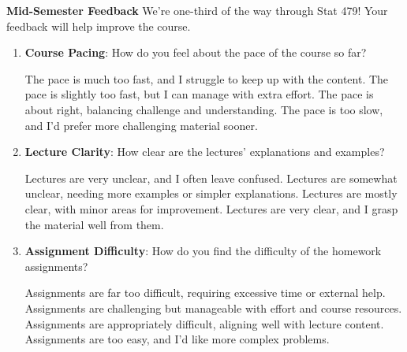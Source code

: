 \documentclass[12pt,letterpaper, onecolumn]{exam}
\begin{document}
\begin{questions}
\begin{solution}
    \begin{parts}
        \part 
        \part 
        \part 
    \end{parts}
\end{solution}

\clearpage


\question[10 points]\textbf{Mid-Semester Feedback}\droppoints
We’re one-third of the way through Stat 479! Your feedback will help improve the course. 

\begin{enumerate}[label=(\alph*)]
    \item \textbf{Course Pacing}: How do you feel about the pace of the course so far?
    \begin{choices}
        \choice The pace is much too fast, and I struggle to keep up with the content.
        \choice The pace is slightly too fast, but I can manage with extra effort.
        \choice The pace is about right, balancing challenge and understanding.
        \choice The pace is too slow, and I’d prefer more challenging material sooner.
    \end{choices}

    \item \textbf{Lecture Clarity}: How clear are the lectures’ explanations and examples?
    \begin{choices}
        \choice Lectures are very unclear, and I often leave confused.
        \choice Lectures are somewhat unclear, needing more examples or simpler explanations.
        \choice Lectures are mostly clear, with minor areas for improvement.
        \choice Lectures are very clear, and I grasp the material well from them.
    \end{choices}

    \item \textbf{Assignment Difficulty}: How do you find the difficulty of the homework assignments?
    \begin{choices}
        \choice Assignments are far too difficult, requiring excessive time or external help.
        \choice Assignments are challenging but manageable with effort and course resources.
        \choice Assignments are appropriately difficult, aligning well with lecture content.
        \choice Assignments are too easy, and I’d like more complex problems.
    \end{choices}


\end{enumerate}
\end{questions}
\end{document}
